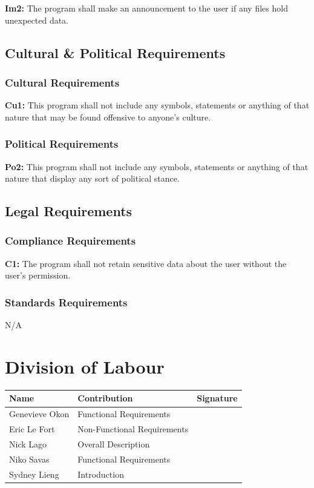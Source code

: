 \documentclass[titlepage]{article}
\begin{document}
\noindent\textbf{Im2:} The program shall make an announcement to the user if any files hold unexpected data.

\subsection{Cultural \& Political Requirements}
\subsubsection{Cultural Requirements}
\textbf{Cu1:} This program shall not include any symbols, statements or anything of that nature that may be found offensive to anyone's culture.
\subsubsection{Political Requirements}
\textbf{Po2:} This program shall not include any symbols, statements or anything of that nature that display any sort of political stance.

\subsection{Legal Requirements}
\subsubsection{Compliance Requirements}
\textbf{C1:} The program shall not retain sensitive data about the user without the user's permission.
\subsubsection{Standards Requirements}
N/A


\appendix
\newpage
\section{Division of Labour}
\label{sec:division_of_labour}
\begin{center}
\begin{tabular}{ | p{6cm} | p{6cm}| p{4cm} | } 
\hline
Name& Contribution & Signature\\ 
\hline
Genevieve Okon & Functional Requirements & \\ 
\hline
Eric Le Fort& Non-Functional Requirements&  \\ 
\hline
Nick Lago& Overall Description  &   \\ 
\hline
Niko Savas& Functional Requirements&   \\ 
\hline
Sydney Lieng& Introduction&   \\ 
\hline
\end{tabular}
\end{center}
\end{document}
